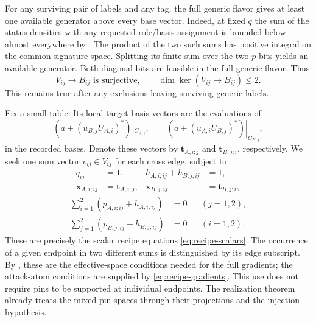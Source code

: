 For any surviving pair of labels and any tag, the full generic flavor
gives at least one available generator above every base vector. Indeed, at fixed $q$
the sum of the status densities with any requested role/basis assignment
is bounded below almost everywhere by
. The product of the two such sums has positive
integral on the common signature space. Splitting its finite sum over
the two $p$ bits yields an available generator. Both diagonal bits are
feasible in the full generic flavor. Thus
\begin{equation}
\label{eq:status-full-projection}
V_{ij}\longrightarrow B_{ij}\text{ is surjective},\qquad
\dim\ker(V_{ij}\longrightarrow B_{ij})\le2.
\end{equation}
This remains true after any exclusions leaving surviving generic labels.

Fix a small table. Its local target basis vectors are the evaluations of
\[
(a+(u_{B,j}U_{A,i})^*)|_{C_{A,i}},\qquad
(a+(u_{A,i}U_{B,j})^*)|_{C_{B,j}},
\]
in the recorded bases. Denote these vectors by
$\mathbf t_{A,i;j}$ and $\mathbf t_{B,j;i}$, respectively. We seek one
sum vector $v_{ij}\in V_{ij}$ for each cross edge, subject to
\begin{equation}
\label{eq:status-local-targets}
\begin{aligned}
q_{ij}&=1,& h_{A,i;ij}+h_{B,j;ij}&=1,\\
\mathbf x_{A,i;ij}&=\mathbf t_{A,i;j},&
\mathbf x_{B,j;ij}&=\mathbf t_{B,j;i},
\end{aligned}
\end{equation}
\begin{equation}
\label{eq:status-coupled-targets}
\begin{aligned}
\sum_{i=1}^2(p_{A,i;ij}+h_{A,i;ij})&=0 &&(j=1,2),\\
\sum_{j=1}^2(p_{B,j;ij}+h_{B,j;ij})&=0 &&(i=1,2).
\end{aligned}
\end{equation}
These are precisely the scalar recipe equations
\eqref{eq:recipe-scalars}. The occurrence of a given endpoint in two
different sums is distinguished by its edge subscript.
By , these are the effective-space
conditions needed for the full gradients; the attack-atom conditions
are supplied by \eqref{eq:recipe-gradients}. This use does not require
pins to be supported at individual endpoints. The realization theorem
already treats the mixed pin spaces through their projections and the
injection hypothesis.

